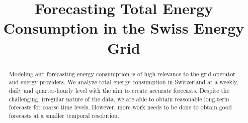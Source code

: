 \documentclass[conference]{IEEEtran}
\begin{document}
\title{Forecasting Total Energy Consumption in the Swiss Energy Grid}

\author{
\and
{}
}


\maketitle

\begin{abstract}
Modeling and forecasting energy consumption is of high relevance to the grid operator and energy providers. We analyze total energy consumption in Switzerland at a weekly, daily and quarter-hourly level with the aim to create accurate forecasts. Despite the challenging, irregular nature of the data, we are able to obtain reasonable long-term forecasts for coarse time levels. However, more work needs to be done to obtain good forecasts at a smaller temporal resolution.
\end{abstract}
\end{document}
